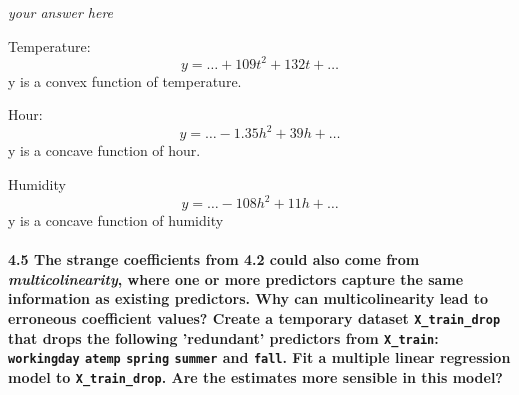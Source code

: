 \documentclass[11pt]{article}
\begin{document}
    \emph{your answer here}

Temperature: \[
y = \ldots+109t^2+132t+\ldots
\] y is a convex function of temperature.

Hour: \[
y = \ldots-1.35h^2+39h+\ldots
\] y is a concave function of hour.

Humidity \[
y = \ldots-108h^2+11h+\ldots
\] y is a concave function of humidity

    \paragraph{\texorpdfstring{\textbf{4.5} The strange coefficients from
4.2 could also come from \emph{multicolinearity}, where one or more
predictors capture the same information as existing predictors. Why can
multicolinearity lead to erroneous coefficient values? Create a
temporary dataset \texttt{X\_train\_drop} that drops the following
'redundant' predictors from \texttt{X\_train}: \texttt{workingday}
\texttt{atemp} \texttt{spring} \texttt{summer} and \texttt{fall}. Fit a
multiple linear regression model to \texttt{X\_train\_drop}. Are the
estimates more sensible in this
model?}{4.5 The strange coefficients from 4.2 could also come from multicolinearity, where one or more predictors capture the same information as existing predictors. Why can multicolinearity lead to erroneous coefficient values? Create a temporary dataset X\_train\_drop that drops the following 'redundant' predictors from X\_train: workingday atemp spring summer and fall. Fit a multiple linear regression model to X\_train\_drop. Are the estimates more sensible in this model?}}\label{the-strange-coefficients-from-4.2-could-also-come-from-multicolinearity-where-one-or-more-predictors-capture-the-same-information-as-existing-predictors.-why-can-multicolinearity-lead-to-erroneous-coefficient-values-create-a-temporary-dataset-x_train_drop-that-drops-the-following-redundant-predictors-from-x_train-workingday-atemp-spring-summer-and-fall.-fit-a-multiple-linear-regression-model-to-x_train_drop.-are-the-estimates-more-sensible-in-this-model}
\end{document}
